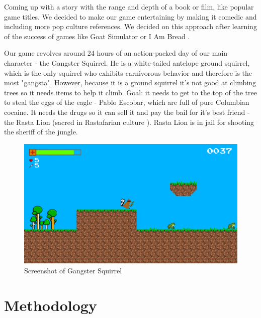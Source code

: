 \documentclass[12p]{article}
\begin{document}
Coming up with a story with the range and depth of a book or film, like popular game titles. We decided to make our game entertaining by making it comedic and including more pop culture references. We decided on this approach after learning of the success of games like Goat Simulator \cite{GoatSimulator} or I Am Bread \cite{IAmBread}.

Our game revolves around 24 hours of an action-packed day of our main character - the Gangster Squirrel. He is a white-tailed antelope ground squirrel, which is the only squirrel who exhibits carnivorous behavior \cite{CarnivorousSquirells} and therefore is the most "gangsta". However, because it is a ground squirrel it’s not good at climbing trees so it needs items to help it climb.
Goal: it needs to get to the top of the tree to steal the eggs of the eagle - Pablo Escobar, which are full of pure Columbian cocaine. It needs the drugs so it can sell it and pay the bail for it’s best friend - the Rasta Lion (sacred in Rastafarian culture \cite{RastaLion}). Rasta Lion is in jail for shooting the sheriff \cite{Sheriff} of the jungle.

\begin{figure}[ht]
  \center
  \includegraphics[width=1\textwidth]{gameplayScreenshot.png}
  \caption{Screenshot of Gangster Squirrel}
\end{figure}


\newpage
\section{Methodology} \label{Methodology}
\end{document}
